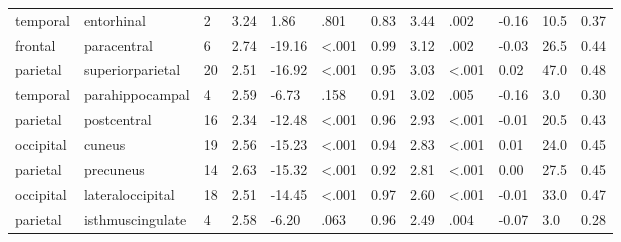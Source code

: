 \documentclass{article}
\begin{document}
\begin{longtable}{llR{1.5cm}R{1cm}R{1.3cm}R{1cm}R{1cm}R{1.3cm}R{1cm}R{1.8cm}R{1.3cm}R{1.8cm}}
  temporal &                entorhinal &            2 &                  3.24 &             1.86 &               .801 &                               0.83 &                          3.44 &                            .002 & -0.16 &   10.5 &      0.37 \\
   frontal &               paracentral &            6 &                  2.74 &           -19.16 &      \textless.001 &                               0.99 &                          3.12 &                            .002 & -0.03 &   26.5 &      0.44 \\
  parietal &          superiorparietal &           20 &                  2.51 &           -16.92 &      \textless.001 &                               0.95 &                          3.03 &                   \textless.001 &  0.02 &   47.0 &      0.48 \\
  temporal &           parahippocampal &            4 &                  2.59 &            -6.73 &               .158 &                               0.91 &                          3.02 &                            .005 & -0.16 &    3.0 &      0.30 \\
  parietal &               postcentral &           16 &                  2.34 &           -12.48 &      \textless.001 &                               0.96 &                          2.93 &                   \textless.001 & -0.01 &   20.5 &      0.43 \\
 occipital &                    cuneus &           19 &                  2.56 &           -15.23 &      \textless.001 &                               0.94 &                          2.83 &                   \textless.001 &  0.01 &   24.0 &      0.45 \\
  parietal &                 precuneus &           14 &                  2.63 &           -15.32 &      \textless.001 &                               0.92 &                          2.81 &                   \textless.001 &  0.00 &   27.5 &      0.45 \\
 occipital &          lateraloccipital &           18 &                  2.51 &           -14.45 &      \textless.001 &                               0.97 &                          2.60 &                   \textless.001 & -0.01 &   33.0 &      0.47 \\
  parietal &          isthmuscingulate &            4 &                  2.58 &            -6.20 &               .063 &                               0.96 &                          2.49 &                            .004 & -0.07 &    3.0 &      0.28 \\

\end{longtable}
\end{document}
